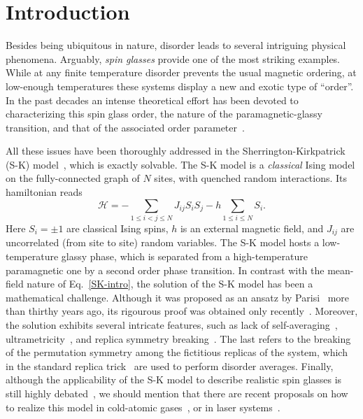 \documentclass[twocolumn,superscriptaddress,prb,10pt]{revtex4-1}
\begin{document}

\maketitle


\section{Introduction}


Besides being ubiquitous in nature, disorder leads to several intriguing 
physical phenomena. Arguably, \emph{spin glasses} provide one of the most 
striking examples. While at any finite temperature disorder prevents the 
usual magnetic ordering, at low-enough temperatures these systems display a 
new and exotic type of ``order''. In the past decades an intense theoretical 
effort has been devoted to characterizing this spin glass order, the nature of 
the paramagnetic-glassy transition, and that of the associated order 
parameter~\cite{binder-1986,parisi-book,young-1998,nishimori-book,castellani-2005}. 

All these issues have been thoroughly addressed in the Sherrington-Kirkpatrick 
(S-K) model~\cite{sherrington-1978,sherrington-1978-prl}, which is exactly 
solvable. The S-K model is a \emph{classical} Ising model on the fully-connected 
graph of $N$ sites, with quenched random interactions. Its hamiltonian reads  
%
\begin{equation}
{\mathcal H}=-\sum\limits_{1\le i<j\le N}J_{ij}S_i S_j-
h\sum\limits_{1\le i\le N}S_i.
\label{SK-intro}
\end{equation}
%
Here $S_i=\pm 1$ are classical Ising spins, $h$ is an external magnetic field, and 
$J_{ij}$ are uncorrelated (from site to site) random variables. The S-K model hosts 
a low-temperature glassy phase, which is separated from a high-temperature paramagnetic 
one by a second order phase transition. In contrast with the mean-field nature of 
Eq.~\eqref{SK-intro}, the solution of the S-K model has been a mathematical challenge. 
Although it was proposed as an ansatz by Parisi~\cite{parisi-1980} more than thirthy 
years ago, its rigourous proof was obtained only recently~\cite{talagrand-2006}. Moreover, 
the solution exhibits several intricate features, such as lack of self-averaging~\cite{pastur-1991}, 
ultrametricity~\cite{mezard-1984,rammal-1986}, and replica symmetry breaking~\cite{parisi-book,
castellani-2005}. The last refers to the breaking of the permutation symmetry among the 
fictitious replicas of the system, which in the standard replica trick~\cite{cardy-book} are 
used to perform disorder averages. Finally, although the applicability of the S-K 
model to describe realistic spin glasses is still highly debated~\cite{yucesoy-2012,
billoire-2012,yucesoy-2013}, we should mention that there are recent proposals on how to 
realize this model in cold-atomic gases~\cite{morrison-2008,rotondo-2015}, or in laser 
systems~\cite{ghofraniha-2015}. 
\end{document}
